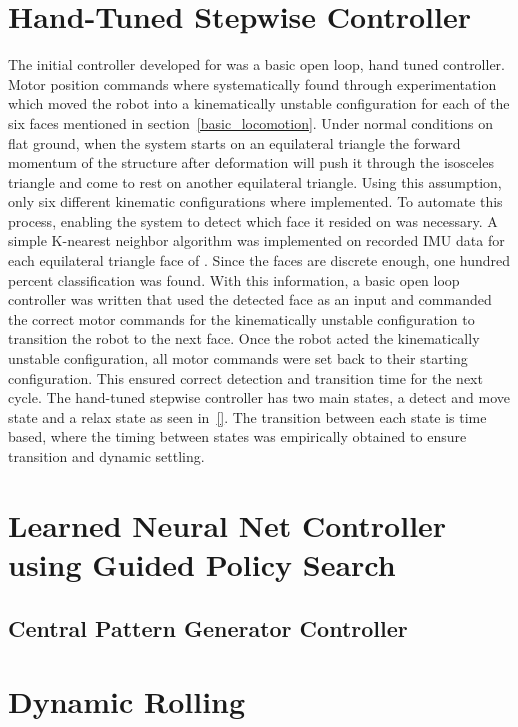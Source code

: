 


\section{Hand-Tuned Stepwise Controller}
\label{hand_stepwise}
The initial controller developed for \SB{} was a basic open loop, hand tuned controller.
Motor position commands where systematically found through experimentation which moved the robot into a kinematically unstable configuration for each of the six faces mentioned in section~\ref{basic_locomotion}.
Under normal conditions on flat ground, when the system starts on an equilateral triangle the forward momentum of the structure after deformation will push it through the isosceles triangle and come to rest on another equilateral triangle.
Using this assumption, only six different kinematic configurations where implemented.
To automate this process, enabling the system to detect which face it resided on was necessary.
A simple K-nearest neighbor algorithm was implemented on recorded IMU data for each equilateral triangle face of \SB{}.
Since the faces are discrete enough, one hundred percent classification was found.
With this information, a basic open loop controller was written that used the detected face as an input and commanded the correct motor commands for the kinematically unstable configuration to transition the robot to the next face.
Once the robot acted the kinematically unstable configuration, all motor commands were set back to their starting configuration.
This ensured correct detection and transition time for the next cycle.
The hand-tuned stepwise controller has two main states, a detect and move state and a relax state as seen in~\ref{}.
The transition between each state is time based, where the timing between states was empirically obtained to ensure transition and dynamic settling.

\section{Learned Neural Net Controller using Guided Policy Search}
\label{learned_controllers}


\subsection{Central Pattern Generator Controller}
\label{cpg_controller}

\section{Dynamic Rolling}
\label{dyncamic_rolling}